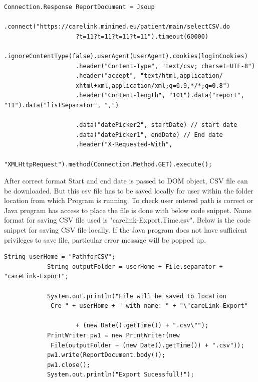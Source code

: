 \documentclass[article,type=msc,colorback,accentcolor=tud9c,twoside,11pt]{tudthesis}
\begin{document}
\begin{lstlisting}
Connection.Response ReportDocument = Jsoup
					.connect("https://carelink.minimed.eu/patient/main/selectCSV.do
					?t=11?t=11?t=11?t=11").timeout(60000)
					.ignoreContentType(false).userAgent(UserAgent).cookies(loginCookies)
					.header("Content-Type", "text/csv; charset=UTF-8")
					.header("accept", "text/html,application/
					xhtml+xml,application/xml;q=0.9,*/*;q=0.8")
					.header("Content-length", "101").data("report", "11").data("listSeparator", ",")
					
					.data("datePicker2", startDate) // start date
					.data("datePicker1", endDate) // End date
					.header("X-Requested-With",
					 "XMLHttpRequest").method(Connection.Method.GET).execute();
\end{lstlisting}
After correct  format Start and end date is passed to DOM object, CSV file can be downloaded. But this csv file has to be saved locally for user within the folder location from which Program is running. To check user entered path is correct or Java program has access to place the file is done with below code snippet. Name format for saving CSV file used is "carelink-Export.Time.csv". Below is the code snippet for saving CSV file locally. If the Java program does not have sufficient privileges to save file, particular error message will be popped up.
\begin{lstlisting}
String userHome = "PathforCSV";
			String outputFolder = userHome + File.separator + "careLink-Export";
			
			System.out.println("File will be saved to location
			 Cre " + userHome + " with name: " + "\"careLink-Export"
			
					+ (new Date().getTime()) + ".csv\"");
			PrintWriter pw1 = new PrintWriter(new
			 File(outputFolder + (new Date().getTime()) + ".csv"));
			pw1.write(ReportDocument.body());
			pw1.close();
			System.out.println("Export Sucessfull!");
\end{lstlisting}
\end{document}
